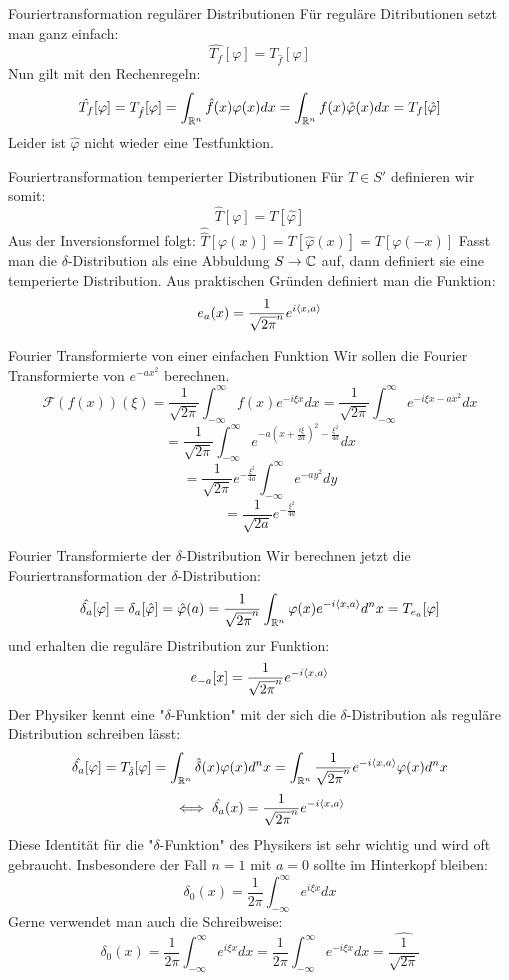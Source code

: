 \begin{Def}{Fouriertransformation regulärer Distributionen}
    Für reguläre Ditributionen setzt man ganz einfach:
    $$\hat{T_f}[\varphi]=T_{\hat{f}}[\varphi]$$
    Nun gilt mit den Rechenregeln:
    $$\hat{T_f} [\varphi]=T_{\hat{f}} [\varphi]=\int_{\mathbb{R}^n}\hat{f}(x)\varphi(x)dx = \int_{\mathbb{R}^n}f(x)\hat{\varphi}(x)dx=T_f[\hat{\varphi}]$$
    Leider ist $\hat{\varphi}$ nicht wieder eine Testfunktion.
\end{Def}
\begin{Def}{Fouriertransformation temperierter Distributionen}
Für  $T\in S'$ definieren wir somit:
$$\hat{T} [\varphi]= T [\hat{\varphi}]$$
Aus der Inversionsformel folgt:
$\hat{\hat{T}} [\varphi(x)]=T [\hat{\varphi}(x)] = T [\varphi(-x)]$
Fasst man die $\delta$-Distribution als eine Abbuldung $S\rightarrow \mathbb{C}$ auf, dann definiert sie eine temperierte Distribution. Aus praktischen Gründen definiert man die Funktion:
$$e_a(x)=\frac{1}{\sqrt{2\pi}^n}e^{i\braket{x,a}}$$
\end{Def}
\begin{Beispiel}{Fourier Transformierte von einer einfachen Funktion}
    Wir sollen die Fourier Transformierte von $e^{-ax^2}$ berechnen.
    $$\mathcal{F}(f(x))(\xi)=\frac{1}{\sqrt{2\pi}}\int_{-\infty}^{\infty} f(x)e^{-i\xi x}dx=\frac{1}{\sqrt{2\pi}}\int_{-\infty}^{\infty} e^{-i\xi x-ax^2}dx$$
    $$=\frac{1}{\sqrt{2\pi}}\int_{-\infty}^{\infty} e^{-a(x+\frac{i\xi}{2a})^2-\frac{\xi^2}{4a}}dx$$
    $$=\frac{1}{\sqrt{2\pi}}e^{-\frac{\xi^2}{4a}}\int_{-\infty}^{\infty}e^{-ay^2}dy$$
    $$=\frac{1}{\sqrt{2a}}e^{-\frac{\xi^2}{4a}}$$
\end{Beispiel}
\begin{Beispiel}{Fourier Transformierte der $\delta$-Distribution}
    Wir berechnen jetzt die Fouriertransformation der $\delta$-Distribution:
    $$\hat{\delta_a} [\varphi]= \delta_a [\hat{\varphi}]=\hat{\varphi}(a)=\frac{1}{\sqrt{2\pi}^n} \int_{\mathbb{R}^n}\varphi(x) e^{-i\braket{x,a}}d^n x = T_{e_a} [\varphi]$$
    und erhalten die reguläre Distribution zur Funktion:
    $$e_{-a}[x]=\frac{1}{\sqrt{2\pi}^n}e^{-i\braket{x,a}}$$
    Der Physiker kennt eine "$\delta$-Funktion" mit der sich die $\delta$-Distribution als reguläre Distribution schreiben lässt:
    $$\hat{\delta_a} [\varphi] = T_{\hat{\delta}} [\varphi] = \int_{\mathbb{R}^n} \hat{\delta}(x)\varphi(x) d^n x = \int_{\mathbb{R}^n} \frac{1}{\sqrt{2\pi}^n}e^{-i\braket{x,a}}\varphi(x)d^n x$$
    $$\iff \hat{\delta_a}(x)=\frac{1}{\sqrt{2\pi}^n}e^{-i\braket{x,a}}$$
    Diese Identität für die "$\delta$-Funktion" des Physikers ist sehr wichtig und wird oft gebraucht. Insbesondere der Fall $n=1$ mit $a=0$ sollte im Hinterkopf bleiben:
    $$\delta_0(x)=\frac{1}{2\pi}\int_{-\infty}^{\infty} e^{i\xi x}dx$$
    Gerne verwendet man auch die Schreibweise:
    $$\delta_0(x)=\frac{1}{2\pi}\int_{-\infty}^{\infty}e^{i\xi x}dx = \frac{1}{2\pi}\int_{-\infty}^{\infty}e^{-i\xi x}dx=\widehat{\frac{1}{\sqrt{2\pi}}}$$

\end{Beispiel}